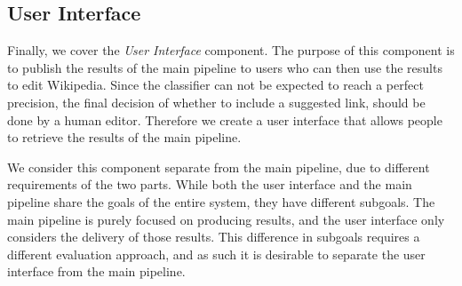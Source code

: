 \subsection{User Interface}
Finally, we cover the \emph{User Interface} component. The purpose of this component is to publish the results of the main pipeline to users who can then use the results to edit Wikipedia. Since the classifier can not be expected to reach a perfect precision, the final decision of whether to include a suggested link, should be done by a human editor. Therefore we create a user interface that allows people to retrieve the results of the main pipeline.

We consider this component separate from the main pipeline, due to different requirements of the two parts. While both the user interface and the main pipeline share the goals of the entire system, they have different subgoals. The main pipeline is purely focused on producing results, and the user interface only considers the delivery of those results. This difference in subgoals requires a different evaluation approach, and as such it is desirable to separate the user interface from the main pipeline.










